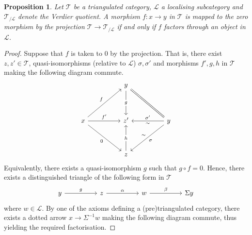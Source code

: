 \documentclass[oneside,11pt]{amsart}
\newtheorem{prop}[thm]{Proposition}
\theoremstyle{definition}
\theoremstyle{remark}
\begin{document}
\begin{prop}
 Let $\mathscr{T} $ be a triangulated category, $\mathscr{L} $ a localising subcategory and $\mathscr{T}_{/\mathscr{L} }$ denote the Verdier quotient. A morphism $f:x \rightarrow y $ in $\mathscr{T} $ is mapped to the zero morphism by the projection $\mathscr{T} \rightarrow \mathscr{T}_{/\mathscr{L} }  $ if and only if $f$ factors through an object in $\mathscr{L} $.
\end{prop}
\begin{proof}
 Suppose that $f$ is taken to $0$ by the projection. That is, there exist $z,z'\in \mathscr{T} $, quasi-isomorphisms (relative to $\mathscr{L} $) $\sigma ,\sigma '$ and morphisms $f',g,h$ in $\mathscr{T} $ making the following diagram commute.      
\[\begin{tikzcd}
	&& y \\
	\\
	x && {z'} && y \\
	\\
	&& z
	\arrow["g"{description}, from=1-3, to=3-3]
	\arrow["f", from=3-1, to=1-3]
	\arrow["{f'}", from=3-1, to=3-3]
	\arrow["0"', from=3-1, to=5-3]
	\arrow[equals, from=3-5, to=1-3]
	\arrow["{\sigma'}"', from=3-5, to=3-3]
	\arrow["\sim", draw=none, from=3-5, to=3-3]
	\arrow["\sigma", from=3-5, to=5-3]
	\arrow["\sim"', draw=none, from=3-5, to=5-3]
	\arrow["h"{description}, from=5-3, to=3-3]
\end{tikzcd}\]
Equivalently, there exists a quasi-isomorphism $g$ such that $g\circ f=0$. Hence, there exists a distinguished triangle of the following form in $\mathscr{T} $
\[\begin{tikzcd}
	y && z && w && {\Sigma y}
	\arrow["g", from=1-1, to=1-3]
	\arrow["\alpha", from=1-3, to=1-5]
	\arrow["\beta", from=1-5, to=1-7]
\end{tikzcd}\]
where $w\in \mathscr{L} $. By one of the axioms defining a (pre)triangulated category, there exists a dotted arrow $x \rightarrow \Sigma^{-1}w$ making the following diagram commute, thus yielding the required factorisation.

\end{proof}
\end{document}
